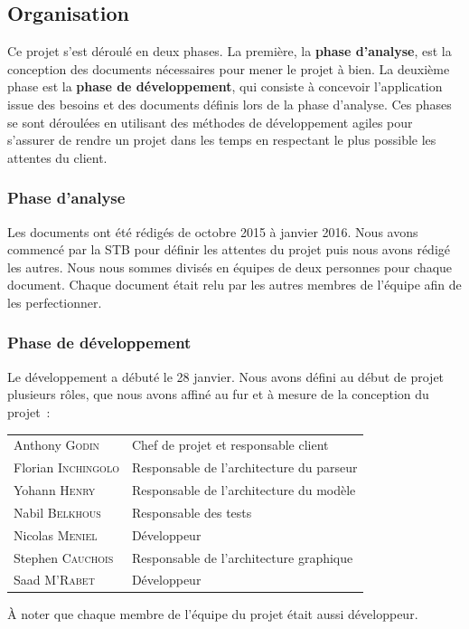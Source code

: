 \documentclass[hidelinks, 10pt,a4paper]{article}
\begin{document}
  \subsection{Organisation}
    Ce projet s'est déroulé en deux phases. 
    La première, la \textbf{phase d'analyse}, est la conception des documents nécessaires 
    pour mener le projet à bien. 
    La deuxième phase est la \textbf{phase de développement}, qui consiste
    à concevoir l'application issue des besoins et des documents définis lors de la
    phase d'analyse. Ces phases se sont déroulées en utilisant des méthodes de développement
    agiles pour s'assurer de rendre un projet dans les temps en respectant le plus possible 
    les attentes du client.
    
    \subsubsection{Phase d’analyse}
      Les documents ont été rédigés de octobre 2015 à janvier 2016. 
      Nous avons commencé par la STB pour définir les attentes du projet puis nous avons rédigé les autres.
      Nous nous sommes divisés en équipes de deux personnes pour chaque document.
      Chaque document était relu par les autres membres de l'équipe afin de les perfectionner.
    
    \subsubsection{Phase de développement}
      Le développement a débuté le 28 janvier. 
      Nous avons défini au début de projet plusieurs rôles, que nous avons affiné au
      fur et à mesure de la conception du projet~:\newline
      
      \begin{tabular}{ll}
      {Anthony \textsc{Godin}} & {Chef de projet et responsable client} \\
      {Florian \textsc{Inchingolo}} & {Responsable de l'architecture du parseur} \\
      {Yohann \textsc{Henry}} & {Responsable de l'architecture du modèle} \\
      {Nabil \textsc{Belkhous}} & {Responsable des tests} \\
      {Nicolas \textsc{Meniel}} & {Développeur} \\
      {Stephen \textsc{Cauchois}} & {Responsable de l'architecture graphique} \\
      {Saad \textsc{M'Rabet}} & {Développeur} \\
      \end{tabular}
  \newline \newline
      À noter que chaque membre de l'équipe du projet était aussi développeur.
      
\end{document}
